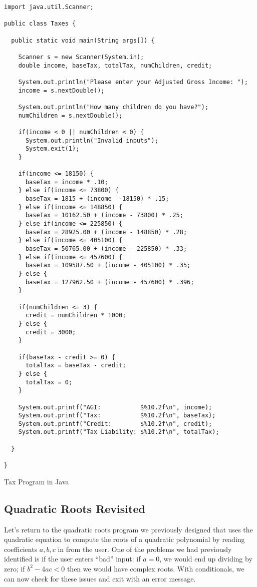 \begin{listing}[h]
\begin{verbatim}
import java.util.Scanner;

public class Taxes {

  public static void main(String args[]) {

    Scanner s = new Scanner(System.in);
    double income, baseTax, totalTax, numChildren, credit;

    System.out.println("Please enter your Adjusted Gross Income: ");
    income = s.nextDouble();

    System.out.println("How many children do you have?");
    numChildren = s.nextDouble();

    if(income < 0 || numChildren < 0) {
      System.out.println("Invalid inputs");   
      System.exit(1);
    }

    if(income <= 18150) {
      baseTax = income * .10;
    } else if(income <= 73800) {
      baseTax = 1815 + (income  -18150) * .15;
    } else if(income <= 148850) {
      baseTax = 10162.50 + (income - 73800) * .25;
    } else if(income <= 225850) {
      baseTax = 28925.00 + (income - 148850) * .28;
    } else if(income <= 405100) {
      baseTax = 50765.00 + (income - 225850) * .33;
    } else if(income <= 457600) {
      baseTax = 109587.50 + (income - 405100) * .35;
    } else {
      baseTax = 127962.50 + (income - 457600) * .396;
    }

    if(numChildren <= 3) {
      credit = numChildren * 1000;
    } else {
      credit = 3000;
    }

    if(baseTax - credit >= 0) {
      totalTax = baseTax - credit;
    } else {
      totalTax = 0;
    }

    System.out.printf("AGI:           $%10.2f\n", income);
    System.out.printf("Tax:           $%10.2f\n", baseTax);
    System.out.printf("Credit:        $%10.2f\n", credit);
    System.out.printf("Tax Liability: $%10.2f\n", totalTax);

  }

}
\end{verbatim}
\caption{Tax Program in Java}
\label{code:java:taxProgram}
\end{listing}

\subsection{Quadratic Roots Revisited}

Let's return to the quadratic roots program we previously designed that uses
the quadratic equation to compute the roots of a quadratic polynomial by reading
coefficients $a, b, c$ in from the user.  One of the problems we had previously 
identified is if the user enters ``bad'' input: if $a = 0$, we would end up dividing
by zero; if $b^2-4ac < 0$ then we would have complex roots.  With conditionals, 
we can now check for these issues and exit with an error message.  

